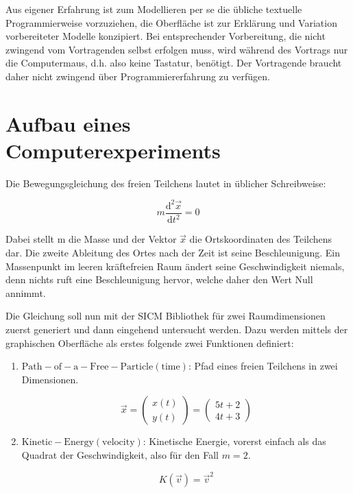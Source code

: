 \documentclass[twocolumn, 10pt]{article}
\newcommand{\varA}[1]{{\operatorname{#1}}}
\begin{document}
Aus eigener Erfahrung ist zum Modellieren per se die übliche textuelle Programmierweise vorzuziehen, die Oberfläche ist zur Erklärung und Variation vorbereiteter Modelle konzipiert. Bei entsprechender Vorbereitung, die nicht zwingend vom Vortragenden selbst erfolgen muss, wird während des Vortrags nur die Computermaus, d.h. also keine Tastatur, benötigt. Der Vortragende braucht daher nicht zwingend über Programmiererfahrung zu verfügen.

\section{Aufbau eines Computerexperiments}

Die Bewegungsgleichung des freien Teilchens lautet in üblicher Schreibweise:

\begin{equation}
m \frac{\mathrm d^2 \vec{x}}{\mathrm d t^2}=0
\label{eq:newton}
\end{equation}

Dabei stellt m die Masse und der Vektor $ \vec{x}$ die Ortskoordinaten des Teilchens dar. Die zweite Ableitung des Ortes nach der Zeit ist seine Beschleunigung. Ein Massenpunkt im leeren kräftefreien Raum ändert seine Geschwindigkeit niemals, denn nichts ruft eine Beschleunigung hervor, welche daher den Wert Null annimmt.

Die Gleichung soll nun mit der SICM Bibliothek für zwei Raumdimensionen zuerst generiert und dann eingehend untersucht werden. Dazu werden mittels der graphischen Oberfläche als erstes folgende zwei Funktionen definiert:
\begin{enumerate}[label=(\alph*)]
\item $\varA{Path-of-a-Free-Particle(time)}$: Pfad eines freien Teilchens in zwei Dimensionen.

\begin{equation}
\vec{x} = \begin{pmatrix} x(t) \\ y(t) \end{pmatrix} =
\begin{pmatrix}5t + 2 \\ 4t + 3\end{pmatrix}
\end{equation}

\item $\varA{Kinetic-Energy(velocity)}$: Kinetische Energie, vorerst einfach als das
  Quadrat der Geschwindigkeit, also für den Fall $m=2$.

\begin{equation}
K(\vec{v}) = \vec{v}^2
\end{equation}
\end{enumerate}
\end{document}
